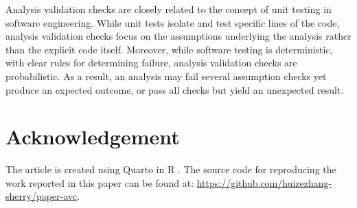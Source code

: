 \documentclass[
  12pt,
]{interact}
\begin{document}
Analysis validation checks are closely related to the concept of unit
testing in software engineering. While unit tests isolate and test
specific lines of the code, analysis validation checks focus on the
assumptions underlying the analysis rather than the explicit code
itself. Moreover, while software testing is deterministic, with clear
rules for determining failure, analysis validation checks are
probabilistic. As a result, an analysis may fail several assumption
checks yet produce an expected outcome, or pass all checks but yield an
unexpected result.

\section{Acknowledgement}\label{acknowledgement}

The article is created using Quarto \citep{Allaire_Quarto_2022} in R
\citep{R}. The source code for reproducing the work reported in this
paper can be found at:
\url{https://github.com/huizezhang-sherry/paper-avc}.


\renewcommand\refname{References}
  
\end{document}
